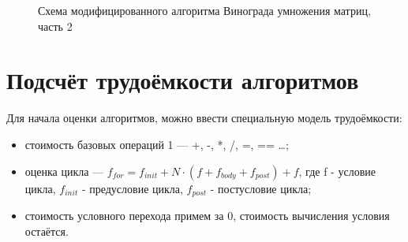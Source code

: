\documentclass[12pt,a4paper]{report}
\begin{document}
\begin{figure}[h]
    \caption{Схема модифицированного алгоритма Винограда умножения матриц, часть 2}
    \label{fig:image}
\end{figure} 

\section{Подсчёт трудоёмкости алгоритмов}

Для начала оценки алгоритмов, можно ввести специальную модель трудоёмкости:
\begin{itemize}
    \item стоимость базовых операций 1 — +, -, *, /, =, == \dots ;
    \item оценка цикла — $f_{for} = f_{init} + N \cdot (f + f_{body} + f_{post}) + f$, где 
    f - условие цикла, $f_{init}$ - предусловие цикла, $f_{post}$ - постусловие цикла;
    \item стоимость условного перехода примем за 0, стоимость вычисления условия остаётся.
\end{itemize}
\end{document}
